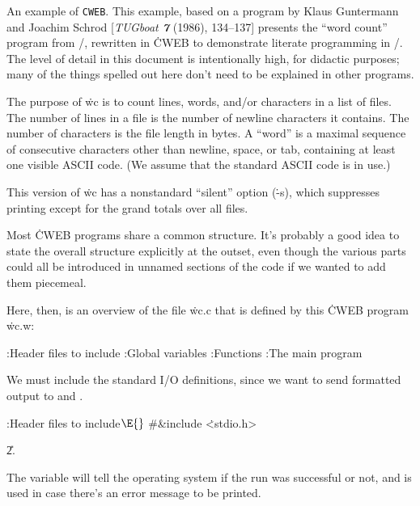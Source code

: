 \documentclass[]{article}
\begin{document}


\nocon %
\datethis %
\def\SPARC{SPARC\-\kern.1em station}


An example of {\tt CWEB}.  This example, based on a program by
Klaus Guntermann and Joachim Schrod [{\sl TUGboat\/ \bf7} (1986),
134--137] presents the ``word count'' program from \UNIX/, rewritten in
\.{CWEB} to demonstrate literate programming in \CEE/.  The level of
detail in this document is intentionally high, for didactic purposes;
many of the things spelled out here don't need to be explained in
other programs.

The purpose of \.{wc} is to count lines, words, and/or characters in a
list of files. The number of lines in a file is the number of newline
characters it contains. The number of characters is the file length in bytes.
A ``word'' is a maximal sequence of consecutive characters other than
newline, space, or tab, containing at least one visible ASCII code.
(We assume that the standard ASCII code is in use.)

This version of \.{wc} has a nonstandard ``silent'' option (\.{-s}),
which suppresses printing except for the grand totals over all files.

\fi

Most \.{CWEB} programs share a common structure.  It's probably a
good idea to state the overall structure explicitly at the outset,
even though the various parts could all be introduced in unnamed
sections of the code if we wanted to add them piecemeal.

Here, then, is an overview of the file \.{wc.c} that is defined
by this \.{CWEB} program \.{wc.w}:

\Y\B{}:Header files to include\X\6
:Global variables\X\6
:Functions\X\6
:The main program\X\par
\fi

We must include the standard I/O definitions, since we want to send
formatted output to  and .

\Y\B\4:Header files to include\X${}\E{}$\6
\8\#\&{include} \.{<stdio.h>}\par
\U2.\fi

 The  variable will tell the operating system if the run
was
successful or not, and  is used in case there's an error
message to
be printed.
\end{document}
